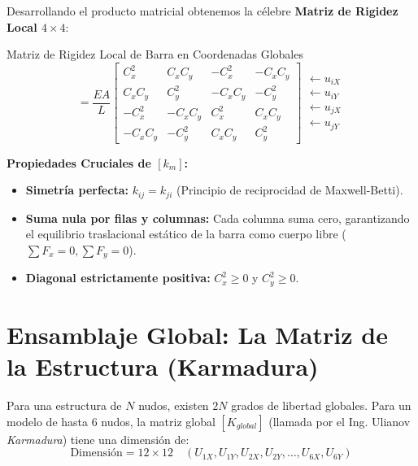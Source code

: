 \documentclass[11pt,a4paper]{article}
\begin{document}
Desarrollando el producto matricial obtenemos la célebre \textbf{Matriz de Rigidez Local $4 \times 4$}:
\begin{formulabox}{Matriz de Rigidez Local de Barra en Coordenadas Globales}
\begin{equation}
    [k_m] = \frac{EA}{L}
    \begin{bmatrix}
        C_x^2     & C_x C_y   & -C_x^2    & -C_x C_y  \\
        C_x C_y   & C_y^2     & -C_x C_y  & -C_y^2    \\
        -C_x^2    & -C_x C_y  & C_x^2     & C_x C_y   \\
        -C_x C_y  & -C_y^2    & C_x C_y   & C_y^2
    \end{bmatrix}
    \begin{matrix}
        \leftarrow u_{iX} \\
        \leftarrow u_{iY} \\
        \leftarrow u_{jX} \\
        \leftarrow u_{jY}
    \end{matrix}
\end{equation}
\end{formulabox}

\textbf{Propiedades Cruciales de $[k_m]$:}
\begin{itemize}
    \item \textbf{Simetría perfecta:} $k_{ij} = k_{ji}$ (Principio de reciprocidad de Maxwell-Betti).
    \item \textbf{Suma nula por filas y columnas:} Cada columna suma cero, garantizando el equilibrio traslacional estático de la barra como cuerpo libre ($\sum F_x = 0, \sum F_y = 0$).
    \item \textbf{Diagonal estrictamente positiva:} $C_x^2 \ge 0$ y $C_y^2 \ge 0$.
\end{itemize}

\section{Ensamblaje Global: La Matriz de la Estructura (Karmadura)}

Para una estructura de $N$ nudos, existen $2N$ grados de libertad globales. Para un modelo de hasta 6 nudos, la matriz global $[K_{global}]$ (llamada por el Ing. Ulianov \textit{Karmadura}) tiene una dimensión de:
\begin{equation}
    \text{Dimensión} = 12 \times 12 \quad (U_{1X}, U_{1Y}, U_{2X}, U_{2Y}, \dots, U_{6X}, U_{6Y})
\end{equation}
\end{document}
